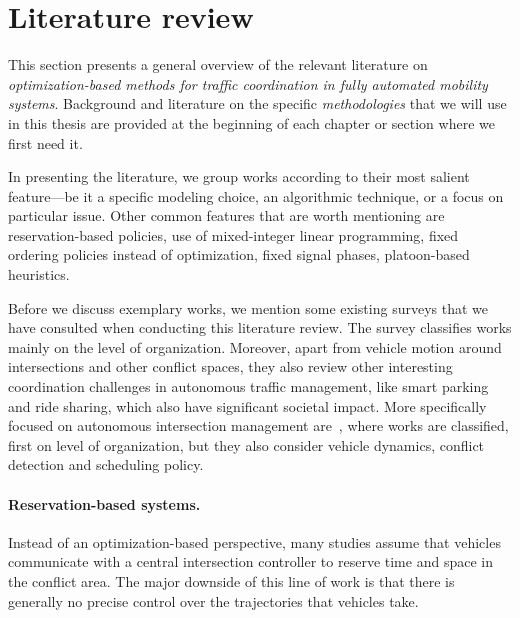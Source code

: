 \documentclass[a4paper]{report}
\theoremstyle{definition}
\theoremstyle{plain}
\newcommand\note[1]{{\color{Navy}\noindent#1}}
\begin{document}
\section{Literature review}
This section presents a general overview of the relevant literature on
\emph{optimization-based methods for traffic coordination in fully automated
  mobility systems}. Background and literature on the specific
\emph{methodologies} that we will use in this thesis are provided at the
beginning of each chapter or section where we first need it.

In presenting the literature, we group works according to their most salient
feature---be it a specific modeling choice, an algorithmic technique, or a focus
on particular issue.
%
\note{Other common features that are worth mentioning are reservation-based policies,
use of mixed-integer linear programming, fixed ordering policies instead of
optimization, fixed signal phases, platoon-based heuristics.}

Before we discuss exemplary works, we mention some existing surveys that we have
consulted when conducting this literature review.
%
The survey \cite{marianiCoordinationAutonomousVehicles2022} classifies works
mainly on the level of organization. Moreover, apart from vehicle motion around
intersections and other conflict spaces, they also review other interesting
coordination challenges in autonomous traffic management, like smart parking and
ride sharing, which also have significant societal impact.
%
More specifically focused on autonomous intersection management
are~\cite{khayatianSurveyIntersectionManagement2020}, where works are
classified, first on level of organization, but they also consider vehicle
dynamics, conflict detection and scheduling policy.


\paragraph{Reservation-based systems.}

Instead of an optimization-based perspective, many studies assume that
vehicles communicate with a central intersection controller to reserve time and
space in the conflict area.
%
The major downside of this line of work is that there is generally no precise
control over the trajectories that vehicles take.
\end{document}
